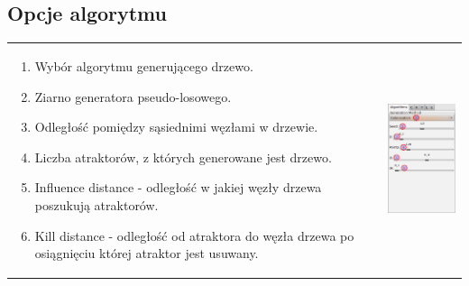 \subsection{Opcje algorytmu}
\begin{threeparttable}
\begin{tabular}{lr}
\parbox[c]{95mm}{
\begin{enumerate}
	\item {Wybór algorytmu generującego drzewo.}
	\item {Ziarno generatora pseudo-losowego.}
	\item {Odległość pomiędzy sąsiednimi węzłami w drzewie.}
	\item {Liczba atraktorów, z których generowane jest drzewo.}
	\item {Influence distance - odległość w jakiej węzły drzewa poszukują atraktorów.}
	\item {Kill distance - odległość od atraktora do węzła drzewa po osiągnięciu której atraktor jest usuwany.}
\end{enumerate}
} &
\parbox[c]{35mm}{
\includegraphics[width=35mm]{images/gui/algorithms_panel.png}
}\\
\end{tabular}
\end{threeparttable}


